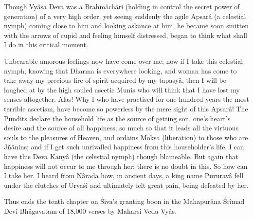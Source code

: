 Though Vy\^asa Deva was a Brahm\^ach\^ari (holding in control the secret power of generation) of a very high order, yet seeing suddenly the agile Apsar\^a (a celestial nymph) coming close to him and looking askance at him, he became soon smitten with the arrows of cupid and feeling himself distressed, began to think what shall I do in this critical moment.

Unbearable amorous feelings now have come over me; now if I take this celestial nymph, knowing that Dharma is everywhere looking, and woman has come to take away my precious fire of spirit acquired by my tapasy\^a, then I will be laughed at by the high souled ascetic Munis who will think that I have lost my senses altogether. Alas! Why I who have practised for one hundred years the most terrible ascetism, have become so powerless by the mere sight of this Apsar\^a! The Pundits declare the household life as the source of getting son, one's heart’s desire and the source of all happiness; so much so that it leads all the virtuous souls to the pleasures of Heaven, and ordains Moksa (liberation) to those who are Jñ\^anins; and if I get such unrivalled happiness from this householder's life, I can have this Deva Kany\^a (the celestial nymph) though blameable. But again that happiness will not occur to me through her; there is no doubt in this. So how can I take her. I heard from N\^arada how, in ancient days, a king name Pururav\^a fell under the clutches of Urva\'s\^i and ultimately felt great pain, being defeated by her.

Thus ends the tenth chapter on \'Siva's granting boon in the Mahapur\^ana \'Sr\^imad Dev\^i Bh\^agavatam of 18,000 verses by Maharsi Veda Vy\^as.